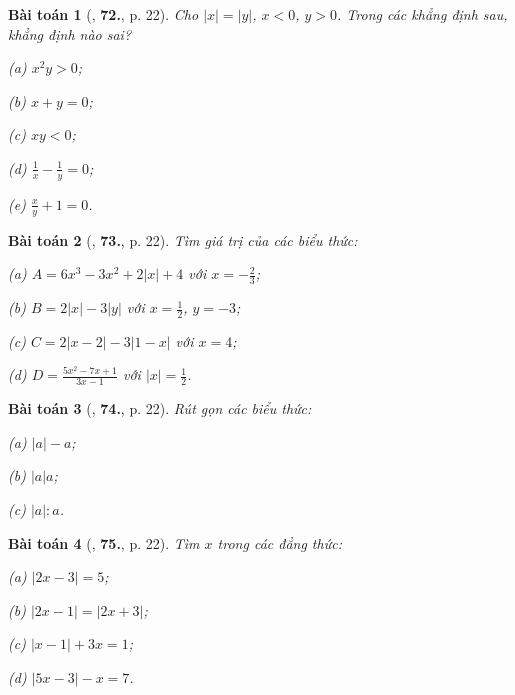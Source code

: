 \documentclass{article}
\numberwithin{equation}{section}
\newtheorem{baitoan}{Bài toán}
\begin{document}
\begin{baitoan}[\cite{Binh_Toan_7_tap_1}, \textbf{72.}, p. 22]
	Cho $|x| = |y|$, $x < 0$, $y > 0$. Trong các khẳng định sau, khẳng định nào sai?
	\begin{enumerate*}
		\item[(a)] $x^2y > 0$;
		\item[(b)] $x + y = 0$;
		\item[(c)] $xy < 0$;
		\item[(d)] $\frac{1}{x} - \frac{1}{y} = 0$;
		\item[(e)] $\frac{x}{y} + 1 = 0$.
	\end{enumerate*}
\end{baitoan}

\begin{baitoan}[\cite{Binh_Toan_7_tap_1}, \textbf{73.}, p. 22]
	Tìm giá trị của các biểu thức:
	\begin{enumerate*}
		\item[(a)] $A = 6x^3 - 3x^2 + 2|x| + 4$ với $x = -\frac{2}{3}$;
		\item[(b)] $B = 2|x| - 3|y|$ với $x = \frac{1}{2}$, $y = -3$;
		\item[(c)] $C = 2|x - 2| - 3|1 - x|$ với $x = 4$;
		\item[(d)] $D = \frac{5x^2 - 7x + 1}{3x - 1}$ với $|x| = \frac{1}{2}$.
	\end{enumerate*}
\end{baitoan}

\begin{baitoan}[\cite{Binh_Toan_7_tap_1}, \textbf{74.}, p. 22]
	Rút gọn các biểu thức:
	\begin{enumerate*}
		\item[(a)] $|a| - a$;
		\item[(b)] $|a|a$;
		\item[(c)] $|a|:a$.
	\end{enumerate*}
\end{baitoan}

\begin{baitoan}[\cite{Binh_Toan_7_tap_1}, \textbf{75.}, p. 22]
	Tìm $x$ trong các đẳng thức:
	\begin{enumerate*}
		\item[(a)] $|2x - 3| = 5$;
		\item[(b)] $|2x - 1| = |2x + 3|$;
		\item[(c)] $|x - 1| + 3x = 1$;
		\item[(d)] $|5x - 3| - x = 7$.
	\end{enumerate*}
\end{baitoan}
\end{document}
